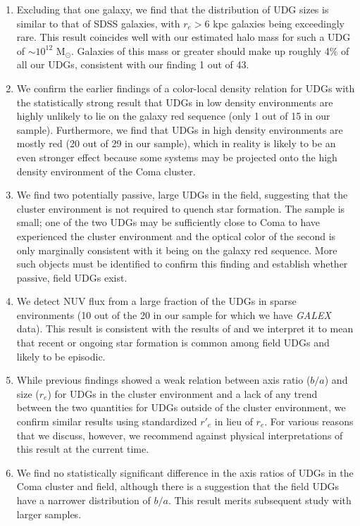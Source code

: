 \documentclass[twocolumn,tighten]{aastex63}
\begin{document}
\begin{enumerate}
    \item Excluding that one galaxy, we find that the distribution of UDG sizes is similar to that of SDSS galaxies, with $r_e > 6$ kpc  galaxies being exceedingly rare. This result coincides well with our estimated halo mass for such a UDG of $\sim 10^{12}$ M$_\odot$. Galaxies of this mass or greater should make up roughly 4\% of all our UDGs, consistent with our finding 1 out of 43. 
    
    \item We confirm the earlier findings of a color-local density relation for UDGs \citep{greco,tanog} with the statistically strong result that UDGs in low density environments are highly unlikely to lie on the galaxy red sequence (only 1 out of 15 in our sample). Furthermore, we find that UDGs in high density environments are mostly red (20 out of 29 in our sample), which in reality is likely to be an even stronger effect because some systems may be projected onto the high density environment of the Coma cluster. 
    
    \item We find two potentially passive, large UDGs in the field, suggesting that the cluster environment is not required to quench star formation. The sample is small; one of the two UDGs may be sufficiently close to Coma to have experienced the cluster environment and the optical color of the second is only marginally consistent with it being on the galaxy red sequence. More such objects must be identified to confirm this finding and establish whether passive, field UDGs exist.
   
    \item We detect NUV flux from a large fraction of the UDGs in sparse environments (10 out of the 20 in our sample for which we have {\sl GALEX} data). This result is consistent with the results of \cite{greco} and we interpret it to mean that recent or ongoing star formation is common among field UDGs and likely to be episodic.
   
   \item 
    While previous findings \citep{Pina2019} showed a weak relation between axis ratio ($b/a$) and size ($r_e$) for UDGs in the cluster environment and a lack of any trend between the two quantities for UDGs outside of the cluster environment, we confirm similar results using standardized $r'_e$ in lieu of $r_e$. For various reasons that we discuss, however, we recommend against physical interpretations of this result at the current time.
    
    \item We find no statistically significant difference in the axis ratios of UDGs in the Coma cluster and field, although there is a suggestion that the field UDGs have a narrower distribution of $b/a$. This result merits subsequent study with larger samples.

\end{enumerate}
\end{document}
